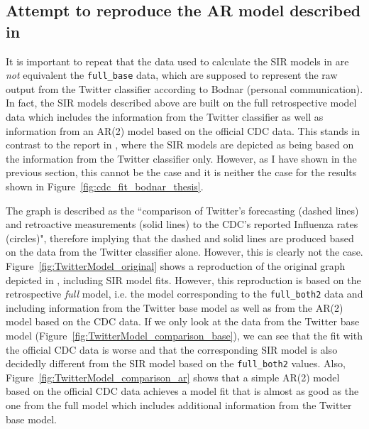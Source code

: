 \documentclass[11pt, a4paper,twoside]{report}\usepackage[]{graphicx}\usepackage[]{color}
\begin{document}
\subsection{Attempt to reproduce the AR model described in \cite{bodnar_data_2015}}
It is important to repeat that the data used to calculate the SIR models in \cite{bodnar_data_2015} are \textit{not} equivalent the \texttt{full\_base} data, which are supposed to represent the raw output from the Twitter classifier according to Bodnar (personal communication). In fact, the SIR models described above are built on the full retrospective model data which includes the information from the Twitter classifier as well as information from an AR(2) model based on the official CDC data. This stands in contrast to the report in \cite{bodnar_data_2015}, where the SIR models are depicted as being based on the information from the Twitter classifier only. However, as I have shown in the previous section, this cannot be the case and it is neither the case for the results shown in Figure~\ref{fig:cdc_fit_bodnar_thesis}.

The graph is described as the ``comparison of Twitter's forecasting (dashed lines) and retroactive measurements (solid lines) to the CDC's reported Influenza rates (circles)", therefore implying that the dashed and solid lines are produced based on the data from the Twitter classifier alone. However, this is clearly not the case. Figure~\ref{fig:TwitterModel_original} shows a reproduction of the original graph depicted in \cite{bodnar_data_2015}, including SIR model fits. However, this reproduction is based on the retrospective \textit{full} model, i.e. the model corresponding to the \texttt{full\_both2} data and including information from the Twitter base model as well as from the AR(2) model based on the CDC data. If we only look at the data from the Twitter base model (Figure~\ref{fig:TwitterModel_comparison_base}), we can see that the fit with the official CDC data is worse and that the corresponding SIR model is also decidedly different from the SIR model based on the \texttt{full\_both2} values. Also, Figure~\ref{fig:TwitterModel_comparison_ar} shows that a simple AR(2) model based on the official CDC data achieves a model fit that is almost as good as the one from the full model which includes additional information from the Twitter base model.
\end{document}
